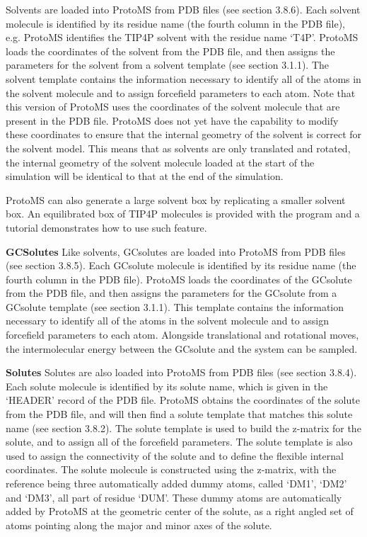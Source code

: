 \documentclass[letterpaper,10pt,english]{sphinxmanual}
\begin{document}
Solvents are loaded into ProtoMS from PDB files (see section 3.8.6). Each solvent molecule is identified by its residue name (the fourth column in the PDB file), e.g. ProtoMS identifies the TIP4P solvent with the residue name ‘T4P’. ProtoMS loads the coordinates of the solvent from the PDB file, and then assigns the parameters for the solvent from a solvent template (see section 3.1.1). The solvent template contains the information necessary to identify all of the atoms in the solvent molecule and to assign forcefield parameters to each atom. Note that this version of ProtoMS uses the coordinates of the solvent molecule that are present in the PDB file. ProtoMS does not yet have the capability to modify these coordinates to ensure that the internal geometry of the solvent is correct for the solvent model. This means that as solvents are only translated and rotated, the internal geometry of
the solvent molecule loaded at the start of the simulation will be identical to that at the end of the simulation.

ProtoMS can also generate a large solvent box by replicating a smaller solvent box. An equilibrated box of TIP4P molecules is provided with the program and a tutorial demonstrates how to use such feature.

\textbf{GCSolutes}
Like solvents, GCsolutes are loaded into ProtoMS from PDB files (see section 3.8.5). Each GCsolute molecule is identified by its residue name (the fourth column in the PDB file). ProtoMS loads the coordinates of the GCsolute from the PDB file, and then assigns the parameters for the GCsolute from a GCsolute template (see section 3.1.1). This template contains the information necessary to identify all of the atoms in the solvent molecule and to assign forcefield parameters to each atom. Alongside translational and rotational moves, the intermolecular energy between the GCsolute and the system can be sampled.

\textbf{Solutes}
Solutes are also loaded into ProtoMS from PDB files (see section 3.8.4). Each solute molecule is identified by its solute name, which is given in the ‘HEADER’ record of the PDB file. ProtoMS obtains the coordinates of the solute from the PDB file, and will then find a solute template that matches this solute name (see section 3.8.2). The solute template is used to build the z-matrix for the solute, and to assign all of the forcefield parameters. The solute template is also used to assign the connectivity of the solute and to define the flexible internal coordinates. The solute molecule is constructed using the z-matrix, with the reference being three automatically added dummy atoms, called ‘DM1’, ‘DM2’ and ‘DM3’, all part of residue ‘DUM’. These dummy atoms are automatically added by ProtoMS at the geometric center of the solute, as a right angled set of atoms pointing along the major and minor axes of the solute.
\end{document}
